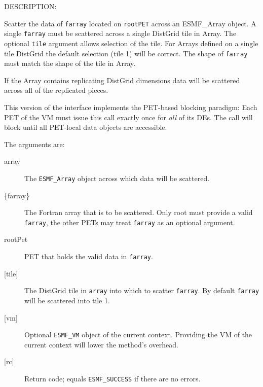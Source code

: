 {\sf DESCRIPTION:\\ }

 
   Scatter the data of {\tt farray} located on {\tt rootPET} 
   across an {ESMF\_Array} object. A single {\tt farray} must be 
   scattered across a single DistGrid tile in Array. The optional {\tt tile} 
   argument allows selection of the tile. For Arrays defined on a single 
   tile DistGrid the default selection (tile 1) will be correct. The 
   shape of {\tt farray} must match the shape of the tile in Array. 
   
   If the Array contains replicating DistGrid dimensions data will be 
   scattered across all of the replicated pieces. 
   
   This version of the interface implements the PET-based blocking paradigm: 
   Each PET of the VM must issue this call exactly once for {\em all} of its 
   DEs. The call will block until all PET-local data objects are accessible. 
   
   The arguments are: 
   \begin{description} 
   \item[array] 
   The {\tt ESMF\_Array} object across which data will be scattered. 
   \item[\{farray\}] 
   The Fortran array that is to be scattered. Only root 
   must provide a valid {\tt farray}, the other PETs may treat 
   {\tt farray} as an optional argument. 
   \item[rootPet] 
   PET that holds the valid data in {\tt farray}. 
   \item[{[tile]}] 
   The DistGrid tile in {\tt array} into which to scatter {\tt farray}. 
   By default {\tt farray} will be scattered into tile 1. 
   \item[{[vm]}] 
   Optional {\tt ESMF\_VM} object of the current context. Providing the 
   VM of the current context will lower the method's overhead. 
   \item[{[rc]}] 
   Return code; equals {\tt ESMF\_SUCCESS} if there are no errors. 
   \end{description} 
   
\setlength{\parskip}{\oldparskip}
\setlength{\parindent}{\oldparindent}
\setlength{\baselineskip}{\oldbaselineskip}
